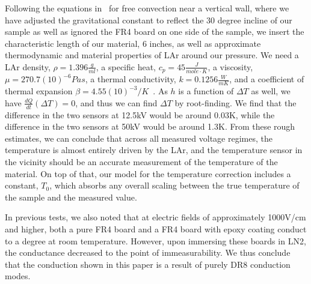 \documentclass[a4paper,12pt]{article}
\newcommand{\RI}[1]{\textcolor{blue}{#1}}
\begin{document}
Following the equations in~\cite{CHURCHILL19751323} for free convection near a vertical wall, where we have adjusted the gravitational constant to reflect the 30 degree incline of our sample as well as ignored the FR4 board on one side of the sample, we insert the characteristic length of our material, 6 inches, as well as approximate thermodynamic and material properties of LAr around our pressure. We need a LAr density, $\rho=1.396\frac{g}{ml}$, a specific heat, $c_p=45\frac{J}{mole \cdot K}$, a viscosity, $\mu=270.7(10)^{-6}Pa s$, a thermal conductivity, $k=0.1256\frac{W}{m K}$, and a coefficient of thermal expansion $\beta=4.55(10)^{ -3}/K$~\cite{GLADUN1971205}\cite{STREETT197459}\cite{lbnl}. As $h$ is a function of $\Delta T$ as well, we have $\frac{dQ}{dt}(\Delta T)=0$, and thus we can find $\Delta T$ by root-finding. We find that the difference in the two sensors at 12.5kV would be around 0.03K, while the difference in the two sensors at 50kV would be around 1.3K. From these rough estimates, we can conclude that across all measured voltage regimes, the temperature is almost entirely driven by the LAr, and the temperature sensor in the vicinity should be an accurate measurement of the temperature of the material. On top of that, our model for the temperature correction includes a constant, $T_0$, which absorbs any overall scaling between the true temperature of the sample and the measured value.

In previous tests, we also noted that at electric fields of approximately 1000V/cm and higher, both a pure FR4 board and a FR4 board with epoxy coating conduct to a degree at room temperature. However, upon immersing these boards in LN2, the conductance decreased to the point of immeasurability. We thus conclude that the conduction shown in this paper is a result of purely DR8 conduction modes.



\end{document}
